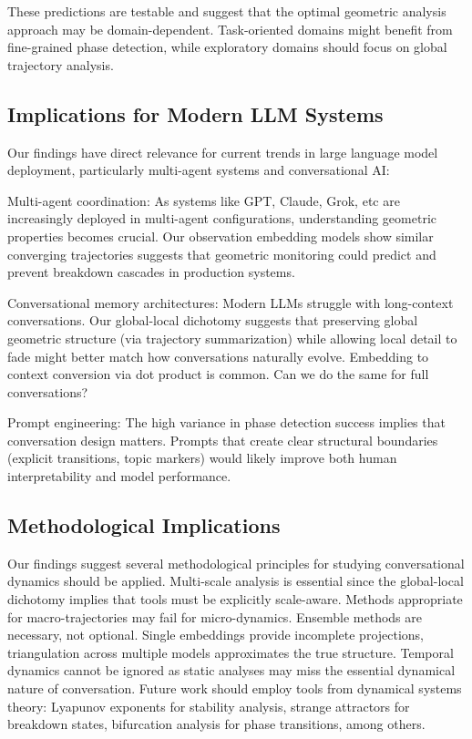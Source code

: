 \documentclass[11pt,letterpaper]{article}
\begin{document}
These predictions are testable and suggest that the optimal geometric analysis approach may be domain-dependent. Task-oriented domains might benefit from fine-grained phase detection, while exploratory domains should focus on global trajectory analysis.

\subsection{Implications for Modern LLM Systems}

Our findings have direct relevance for current trends in large language model deployment, particularly multi-agent systems and conversational AI:

Multi-agent coordination: As systems like GPT, Claude, Grok, etc are increasingly deployed in multi-agent configurations, understanding geometric properties becomes crucial. Our observation embedding models show similar converging trajectories suggests that geometric monitoring could predict and prevent breakdown cascades in production systems.

Conversational memory architectures: Modern LLMs struggle with long-context conversations. Our global-local dichotomy suggests that preserving global geometric structure (via trajectory summarization) while allowing local detail to fade might better match how conversations naturally evolve. Embedding to context conversion via dot product is common. Can we do the same for full conversations?

Prompt engineering: The high variance in phase detection success implies that conversation design matters. Prompts that create clear structural boundaries (explicit transitions, topic markers) would likely improve both human interpretability and model performance.

\subsection{Methodological Implications}

Our findings suggest several methodological principles for studying conversational dynamics should be applied. Multi-scale analysis is essential since the global-local dichotomy implies that tools must be explicitly scale-aware. Methods appropriate for macro-trajectories may fail for micro-dynamics. Ensemble methods are necessary, not optional. Single embeddings provide incomplete projections, triangulation across multiple models approximates the true structure. Temporal dynamics cannot be ignored as static analyses may miss the essential dynamical nature of conversation. Future work should employ tools from dynamical systems theory: Lyapunov exponents for stability analysis, strange attractors for breakdown states, bifurcation analysis for phase transitions, among others.
\end{document}

